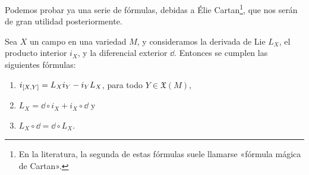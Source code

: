 Podemos probar ya una serie de fórmulas, debidas a Élie Cartan\footnote{En la literatura, la segunda de estas fórmulas suele llamarse «fórmula mágica de Cartan».}, que nos serán de gran utilidad posteriormente.
\begin{thm}
  Sea $X$ un campo en una variedad $M$, y consideramos la derivada de Lie $L_X$, el producto interior $i_X$, y la diferencial exterior $\dd$. Entonces se cumplen las siguientes fórmulas:
  \begin{enumerate}
    \item $i_{\left[X,Y\right]}=L_X i_Y - i_Y L_X$, para todo $Y \in \mathfrak{X}(M)$,
    \item $L_X= \dd \circ i_X + i_X \circ \dd $ y
    \item $L_X\circ \dd = \dd \circ L_X$.
  \end{enumerate}
\end{thm}

